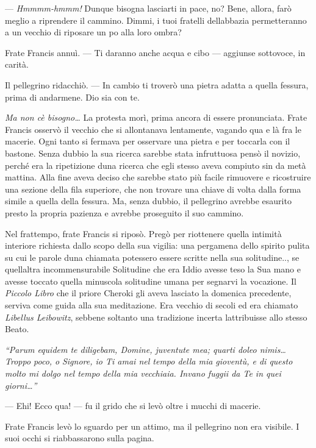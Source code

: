 --- \emph{Hmmmm-hmmm!} Dunque bisogna lasciarti in pace, no? Bene,
allora, farò meglio a riprendere il cammino. Dimmi, i tuoi fratelli
dell\textquotesingle abbazia permetteranno a un vecchio di riposare un
po\textquotesingle{} alla loro ombra?

Frate Francis annuì. --- Ti daranno anche acqua e cibo --- aggiunse
sottovoce, in carità.

Il pellegrino ridacchiò. --- In cambio ti troverò una pietra adatta a
quella fessura, prima di andarmene. Dio sia con te.

\emph{Ma non c\textquotesingle è bisogno\ldots{}} La protesta morì,
prima ancora di essere pronunciata. Frate Francis osservò il vecchio che
si allontanava lentamente, vagando qua e là fra le macerie. Ogni tanto
si fermava per osservare una pietra e per toccarla con il bastone. Senza
dubbio la sua ricerca sarebbe stata infruttuosa pensò il novizio, perché
era la ripetizione d\textquotesingle una ricerca che egli stesso aveva
compiuto sin da metà mattina. Alla fine aveva deciso che sarebbe stato
più facile rimuovere e ricostruire una sezione della fila superiore, che
non trovare una chiave di volta dalla forma simile a quella della
fessura. Ma, senza dubbio, il pellegrino avrebbe esaurito presto la
propria pazienza e avrebbe proseguito il suo cammino.

Nel frattempo, frate Francis si riposò. Pregò per riottenere quella
intimità interiore richiesta dallo scopo della sua vigilia: una
pergamena dello spirito pulita su cui le parole d\textquotesingle una
chiamata potessero essere scritte nella sua solitudine.., se
quell\textquotesingle altra incommensurabile Solitudine che era Iddio
avesse teso la Sua mano e avesse toccato quella minuscola solitudine
umana per segnarvi la vocazione. Il \emph{Piccolo Libro} che il priore
Cheroki gli aveva lasciato la domenica precedente, serviva come guida
alla sua meditazione. Era vecchio di secoli ed era chiamato
\emph{Libellus Leibowitz}, sebbene soltanto una tradizione incerta
l\textquotesingle attribuisse allo stesso Beato.

\emph{``Parum equidem te diligebam, Domine, juventute mea; quarti doleo
	nimis\ldots{} Troppo poco, o} \emph{Signore, io Ti amai nel tempo della
	mia gioventù, e di questo molto mi dolgo nel tempo della mia vecchiaia.
	Invano fuggii da Te in quei giorni\ldots''}

--- Ehi! Ecco qua! --- fu il grido che si levò oltre i mucchi di
macerie.

Frate Francis levò lo sguardo per un attimo, ma il pellegrino non era
visibile. I suoi occhi si riabbassarono sulla pagina.

